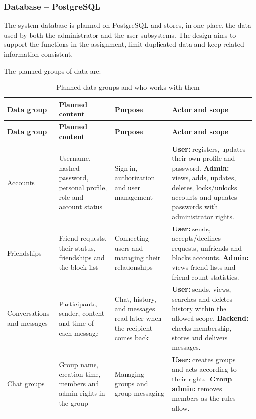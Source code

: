 \subsubsection{Database -- PostgreSQL}
\label{subsubsec:postgresql-database}

The system database is planned on PostgreSQL and stores, in one place, the data
used by both the administrator and the user subsystems. The design aims to support
the functions in the assignment, limit duplicated data and keep related
information consistent.

The planned groups of data are:

\begingroup
\small
\setlength{\tabcolsep}{4pt}
\begin{longtable}{|L{2cm}|L{4cm}|L{3cm}|L{\dimexpr\textwidth-9cm-8\arrayrulewidth\relax}|}
  \caption{Planned data groups and who works with them}
  \label{tab:data-groups}\\
  \hline
  \textbf{Data group} & \textbf{Planned content} &
  \textbf{Purpose} & \textbf{Actor and scope}\\
  \hline
  \endfirsthead
  \hline
  \textbf{Data group} & \textbf{Planned content} &
  \textbf{Purpose} & \textbf{Actor and scope}\\
  \hline
  \endhead
  Accounts &
  Username, hashed password, personal profile, role and account status &
  Sign-in, authorization and user management &
  \textbf{User:} registers, updates their own profile and password.
  \textbf{Admin:} views, adds, updates, deletes, locks/unlocks accounts and updates
  passwords with administrator rights.\\
  \hline
  Friendships &
  Friend requests, their status, friendships and the block list &
  Connecting users and managing their relationships &
  \textbf{User:} sends, accepts/declines requests, unfriends and blocks accounts.
  \textbf{Admin:} views friend lists and friend-count statistics.\\
  \hline
  Conversations and messages &
  Participants, sender, content and time of each message &
  Chat, history, and messages read later when the recipient comes back &
  \textbf{User:} sends, views, searches and deletes history within the allowed scope.
  \textbf{Backend:} checks membership, stores and delivers messages.\\
  \hline
  Chat groups &
  Group name, creation time, members and admin rights in the group &
  Managing groups and group messaging &
  \textbf{User:} creates groups and acts according to their rights.
  \textbf{Group admin:} removes members as the rules allow.

\end{longtable}
